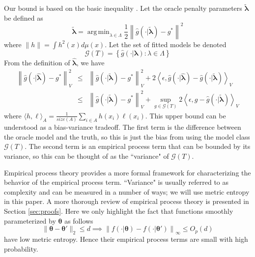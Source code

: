 \documentclass[12pt]{article}
\DeclareMathOperator*{\argmin}{arg\,min}
\begin{document}
Our bound is based on the basic inequality \citep{van2000empirical}. Let the oracle penalty parameters $\tilde{\boldsymbol \lambda}$ be defined as
\begin{equation}
\tilde{\boldsymbol \lambda} = \argmin_{\lambda \in \Lambda} \frac{1}{2} \left \| \hat{g}(\cdot | \tilde{\boldsymbol \lambda}) - g^* \right \|^2
\end{equation}
where $\| h \| = \int h^2(x) d\mu(x)$. Let the set of fitted models be denoted
\begin{equation}
\label{function_class_GT}
\mathcal{G}(T) = \left \{ \hat{g}(\cdot | \boldsymbol \lambda) : \lambda \in \Lambda  \right \}
\end{equation}
From the definition of $\hat{\boldsymbol \lambda}$, we have
\begin{eqnarray}
\label{basic_ineq}
\left \|\hat{g}(\cdot | \hat{\boldsymbol \lambda}) - g^* \right \|_V^2
& \le &
\left \| \hat{g}(\cdot | \tilde{\boldsymbol \lambda}) - g^* \right \|_V^2 +
2 \left \langle \epsilon, \hat{g}(\cdot | \hat{\boldsymbol \lambda}) - \hat{g}(\cdot | \tilde{\boldsymbol \lambda}) \right \rangle_V \\
& \le &
\left \| \hat{g}(\cdot | \tilde{\boldsymbol \lambda}) - g^* \right \|_V^2 +
\sup_{g \in \mathcal{G}(T)} 2 \left \langle \epsilon, g - \hat{g}(\cdot | \tilde{\boldsymbol \lambda}) \right \rangle_V
\end{eqnarray}
where $\langle h, \ell \rangle_A = \frac{1}{size(A)}\sum_{i\in A} h(x_i) \ell(x_i)$. This upper bound can be understood as a bias-variance tradeoff. The first term is the difference between the oracle model and the truth, so this is just the bias from using the model class $\mathcal{G}(T)$. The second term is an empirical process term that can be bounded by its variance, so this can be thought of as the ``variance" of $\mathcal{G}(T)$.

Empirical process theory provides a more formal framework for characterizing the behavior of the empirical process term. ``Variance" is usually referred to as complexity and can be measured in a number of ways; we will use metric entropy in this paper. A more thorough review of empirical process theory is presented in Section \ref{sec:proofs}. Here we only highlight the fact that functions smoothly parameterized by $\boldsymbol \theta$ as follows
\begin{equation}
\| \boldsymbol \theta - \boldsymbol \theta' \|_2 \le d \implies \left \| f(\cdot | \boldsymbol \theta) - f(\cdot | \boldsymbol \theta') \right \|_\infty \le O_p(d)
\end{equation}
have low metric entropy. Hence their empirical process terms are small with high probability.
\end{document}
